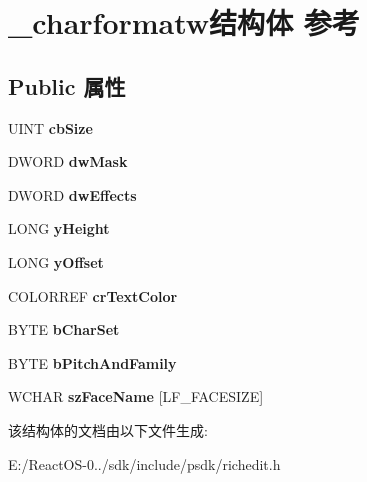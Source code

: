 \hypertarget{struct__charformatw}{}\section{\+\_\+charformatw结构体 参考}
\label{struct__charformatw}
\subsection*{Public 属性}
\begin{DoxyCompactItemize}
\item 
\mbox{\label{struct__charformatw_a61cfef85f9fe8ace1184618b6bf32502}} 
U\+I\+NT {\bfseries cb\+Size}
\item 
\mbox{\label{struct__charformatw_a9ed6a83f3d0bdfb618fd46af7af70632}} 
D\+W\+O\+RD {\bfseries dw\+Mask}
\item 
\mbox{\label{struct__charformatw_ac5ea0f7d198d02751ca44267f5190179}} 
D\+W\+O\+RD {\bfseries dw\+Effects}
\item 
\mbox{\label{struct__charformatw_a6b3a808f1c44dab55c61c1f0184f892c}} 
L\+O\+NG {\bfseries y\+Height}
\item 
\mbox{\label{struct__charformatw_a101e50f4dd190f2a789356d10bcf9f4e}} 
L\+O\+NG {\bfseries y\+Offset}
\item 
\mbox{\label{struct__charformatw_a0fb53b9ef4a7d15d86b5e9d9f1257bf2}} 
C\+O\+L\+O\+R\+R\+EF {\bfseries cr\+Text\+Color}
\item 
\mbox{\label{struct__charformatw_ad896668553a809cbe50f397c3e498731}} 
B\+Y\+TE {\bfseries b\+Char\+Set}
\item 
\mbox{\label{struct__charformatw_ae2f7b3133d659eba9e24c65498a8cac9}} 
B\+Y\+TE {\bfseries b\+Pitch\+And\+Family}
\item 
\mbox{\label{struct__charformatw_a9f0f9224f29ebb8b79495dc67fa31f74}} 
W\+C\+H\+AR {\bfseries sz\+Face\+Name} \mbox{[}L\+F\+\_\+\+F\+A\+C\+E\+S\+I\+ZE\mbox{]}
\end{DoxyCompactItemize}


该结构体的文档由以下文件生成\+:\begin{DoxyCompactItemize}
\item 
E\+:/\+React\+O\+S-\/0../sdk/include/psdk/richedit.\+h\end{DoxyCompactItemize}
